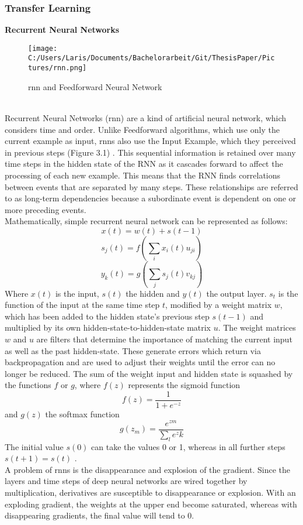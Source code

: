\documentclass[a4paper, 11pt,titlepage,oneside,openany]{book}
\begin{document}
\subsubsection{Transfer Learning}
\textbf{Recurrent Neural Networks}
\begin{figure}[h]
	\centering
	\texttt{[image: C:/Users/Laris/Documents/Bachelorarbeit/Git/ThesisPaper/Pictures/rnn.png]}
	\caption{\gls{rnn} and Feedforward Neural Network \cite{rnn}}
\end{figure}\\
Recurrent Neural Networks (\gls{rnn}) are a kind of artificial neural network, which considers time and order. Unlike Feedforward algorithms, which use only the current example as input, \gls{rnn}s also use the Input Example, which they perceived in previous steps (Figure 3.1) \cite{feedforward}. 
This sequential information is retained over many time steps in the hidden state of the RNN as it cascades forward to affect the processing of each new example. This means that the RNN finds correlations between events that are separated by many steps. These relationships are referred to as long-term dependencies because a subordinate event is dependent on one or more preceding events.\\
\newpage
\noindent Mathematically, simple recurrent neural network \cite{ELMAN1990179} can be represented as follows:
\[
x(t)=w(t)+s(t-1)
\]
\[
s_j(t)=f(\sum_{i}x_i(t)u_{ji})
\]
\[
y_k(t)=g(\sum_{j}s_j(t)v_{kj})
\]
Where $x(t)$ is the input, $s(t)$ the hidden and $y(t)$ the output layer. $s_t$ is the function of the input at the same time step $t$, modified by a weight matrix $w$, which has been added to the hidden state's previous step $s(t-1)$ and multiplied by its own hidden-state-to-hidden-state matrix $u$. The weight matrices $w$ and $u$ are filters that determine the importance of matching the current input as well as the past hidden-state. These generate errors which return via backpropagation and are used to adjust their weights until the error can no longer be reduced. The sum of the weight input and hidden state is squashed by the functions $f$ or $g$, where  $f(z)$ represents the sigmoid function
\[
f(z)=\frac{1}{1+e^{-z}}
\]
and $g(z)$ the softmax function
\[
g(z_m)=\frac{e^{zm}}{\sum_{l}e^zk}
\]
The initial value $s(0)$ can take the values 0 or 1, whereas in all further steps $s(t+1)=s(t)$ \cite{rnnmodel}. \\
\noindent A problem of \gls{rnn}s is the disappearance and explosion of the gradient. Since the layers and time steps of deep neural networks are wired together by multiplication, derivatives are susceptible to disappearance or explosion. With an exploding gradient, the weights at the upper end become saturated, whereas with disappearing gradients, the final value will tend to 0. \\
\end{document}
